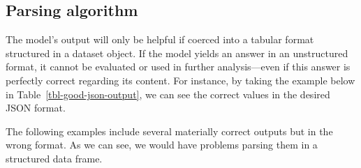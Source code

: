 \documentclass[
  12pt,
]{article}
\begin{document}
\subsection{Parsing algorithm}\label{parsing-algorithm}

The model's output will only be helpful if coerced into a tabular format
structured in a dataset object. If the model yields an answer in an
unstructured format, it cannot be evaluated or used in further
analysis---even if this answer is perfectly correct regarding its
content. For instance, by taking the example below in
Table~\ref{tbl-good-json-output}, we can see the correct values in the
desired JSON format.

\begin{table}


\caption{\label{tbl-good-json-output}Example of correct output
(simplified version).}

\end{table}%

The following examples include several materially correct outputs but in
the wrong format. As we can see, we would have problems parsing them in
a structured data frame.

\begingroup\fontsize{9}{11}\selectfont
\end{document}
